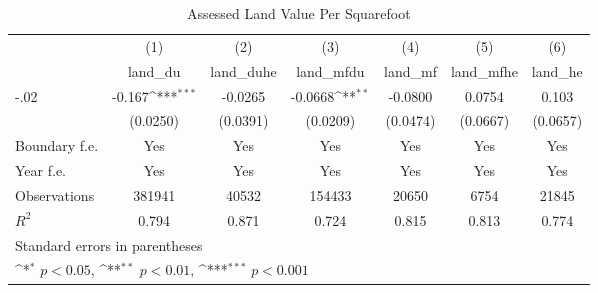 \begin{table}[htbp]\centering
\def\sym#1{\ifmmode^{#1}\else\(^{#1}\)\fi}
\caption{Assessed Land Value Per Squarefoot}
\begin{tabular}{l*{6}{c}}
\hline\hline
                    &\multicolumn{1}{c}{(1)}&\multicolumn{1}{c}{(2)}&\multicolumn{1}{c}{(3)}&\multicolumn{1}{c}{(4)}&\multicolumn{1}{c}{(5)}&\multicolumn{1}{c}{(6)}\\
                    &\multicolumn{1}{c}{land\_du}&\multicolumn{1}{c}{land\_duhe}&\multicolumn{1}{c}{land\_mfdu}&\multicolumn{1}{c}{land\_mf}&\multicolumn{1}{c}{land\_mfhe}&\multicolumn{1}{c}{land\_he}\\
\hline
-.02                &      -0.167\sym{***}&     -0.0265         &     -0.0668\sym{**} &     -0.0800         &      0.0754         &       0.103         \\
                    &    (0.0250)         &    (0.0391)         &    (0.0209)         &    (0.0474)         &    (0.0667)         &    (0.0657)         \\
[1em]
Boundary f.e.       &         Yes         &         Yes         &         Yes         &         Yes         &         Yes         &         Yes         \\
[1em]
Year f.e.           &         Yes         &         Yes         &         Yes         &         Yes         &         Yes         &         Yes         \\
\hline
Observations        &      381941         &       40532         &      154433         &       20650         &        6754         &       21845         \\
\(R^{2}\)           &       0.794         &       0.871         &       0.724         &       0.815         &       0.813         &       0.774         \\
\hline\hline
\multicolumn{7}{l}{\footnotesize Standard errors in parentheses}\\
\multicolumn{7}{l}{\footnotesize \sym{*} \(p<0.05\), \sym{**} \(p<0.01\), \sym{***} \(p<0.001\)}\\
\end{tabular}
\end{table}
